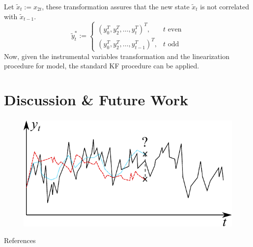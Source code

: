 \documentclass{beamer}
\theoremstyle{definition}
\theoremstyle{remark}
\theoremstyle{example}
\newif\ifinsection
\newif\ifinsubsection
\let\oldsection\section
\renewcommand{\section}{%
  \global\insectiontrue%
  \global\insubsectionfalse%
  \oldsection}
\newcommand {\aframe}[1] {%
  \begin{frame}
    \ifinsection\frametitle{\secname}\fi
    \ifinsubsection\framesubtitle{\subsecname}\fi
  #1
  \end{frame}
}
\begin{document}
\aframe{
  Let $\tilde{x}_t:=x_{2t}$, these transformation assures that the new state $\tilde{x}_t$ is not correlated with $\tilde{x}_{t-1}$.
  \[\tilde{y}_t^*:=\begin{cases}
   (y_0^T, y_2^T,\ldots,y_t^T)^T,&t\text{ even}\\
   (y_0^T, y_2^T,\ldots,y_{t-1}^T)^T,&t\text{ odd}
 \end{cases}\]
Now, given the instrumental variables transformation and the linearization procedure for model, the standard KF procedure can be applied.
}

\section{Discussion \& Future Work}

\aframe{
  \begin{figure}[H]
    \includegraphics[scale=1]{drawing.pdf}
  \end{figure}
}

\begin{frame}[allowframebreaks]{References}
  \printbibliography
\end{frame}

\begin{frame}
  \begin{minipage}[t][.8\textheight]{\textwidth}
    \vfill
    \begin{center}
          \begin{multicols}{2}
             \\
             \\
             \\

            \columnbreak
             \\
             \\
    \end{multicols}
    \end{center}
  \end{minipage}
\end{frame}
\end{document}
